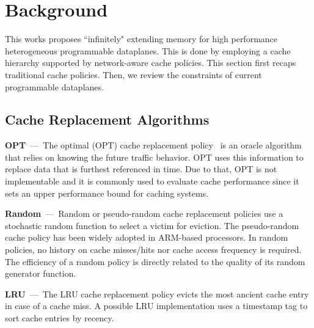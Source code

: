 

\section{Background}\label{sec:back}
This works proposes ``infinitely" extending memory for high performance heterogeneous programmable dataplanes.
This is done by employing a cache hierarchy supported by network-aware cache policies.
This section first recaps traditional cache policies. 
Then, we review the constraints of current programmable dataplanes.

\subsection{Cache Replacement Algorithms}
\textbf{OPT}~---~The optimal (OPT) cache replacement policy~\cite{Belady:66} is an oracle algorithm that relies on knowing the future traffic behavior.
OPT uses this information to replace data that is furthest referenced in time.
Due to that, OPT is not implementable and it is commonly used to evaluate cache performance since it sets an upper performance bound for caching systems.

\textbf{Random}~---~Random or pseudo-random cache replacement policies use a stochastic random function to select a victim for eviction.
The pseudo-random cache policy has been widely adopted in ARM-based processors.
In random policies, no history on cache misses/hits nor cache access frequency is required.
The efficiency of a random policy is directly related to the quality of its random generator function.

\textbf{LRU}~---~The LRU cache replacement policy evicts the most ancient cache entry in case of a cache miss.
A possible LRU implementation uses a timestamp tag to sort cache entries by recency.%

